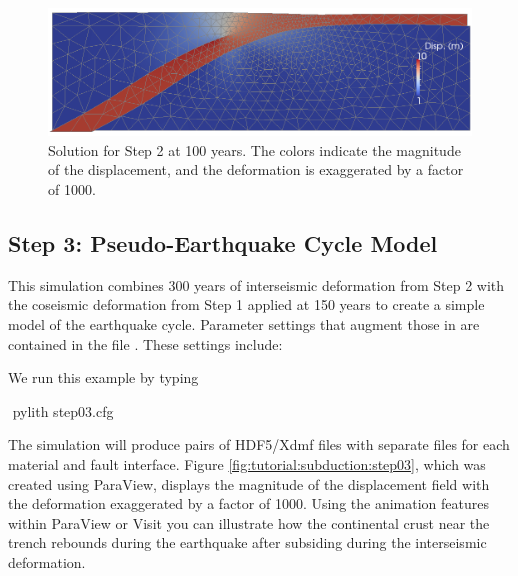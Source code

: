 \begin{figure}
  \includegraphics[width=4.5in]{examples/figs/subduction_step02_soln}
  \caption{Solution for Step 2 at 100 years. The colors indicate the
    magnitude of the displacement, and the deformation is exaggerated
    by a factor of 1000.}
  \label{fig:tutorial:subduction:step02}
\end{figure}


\subsection{Step 3: Pseudo-Earthquake Cycle Model}

This simulation combines 300 years of interseismic deformation from
Step 2 with the coseismic deformation from Step 1 applied at 150 years
to create a simple model of the earthquake cycle. Parameter settings
that augment those in  are contained in the
file . These settings include:
\begin{inventory}
\end{inventory}
We run this example by typing
\begin{shell}
$$ pylith step03.cfg
\end{shell}
The simulation will produce pairs of HDF5/Xdmf files with separate
files for each material and fault interface. Figure \vref{fig:tutorial:subduction:step03},
which was created using ParaView, displays the magnitude of the displacement
field with the deformation exaggerated by a factor of 1000. Using
the animation features within ParaView or Visit you can illustrate
how the continental crust near the trench rebounds during the earthquake
after subsiding during the interseismic deformation. 

